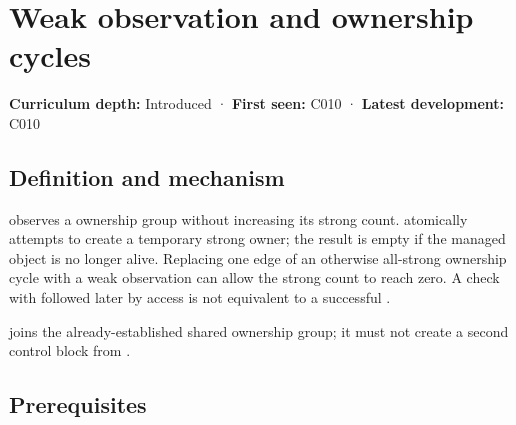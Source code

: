 \hypertarget{appendix-b9548675eb2b}{}\label{referencestart:appendix-b9548675eb2b}
\section{Weak observation and ownership cycles}\label{appendix-b9548675eb2b-weak-observation-and-ownership-cycles}

\hypertarget{appendix-b9548675eb2b-weak-observation-and-ownership-cycles}{}

\textbf{Curriculum depth:} Introduced · \textbf{First seen:} C010 · \textbf{Latest development:} C010

\begin{allmightroledefinition}

\subsection{Definition and mechanism}\label{appendix-b9548675eb2b-definition-and-mechanism}

\hypertarget{appendix-b9548675eb2b-definition-and-mechanism}{}

 observes a  ownership group without increasing its strong count.  atomically attempts to create a temporary strong owner; the result is empty if the managed object is no longer alive. Replacing one edge of an otherwise all-strong ownership cycle with a weak observation can allow the strong count to reach zero. A check with  followed later by access is not equivalent to a successful .

\end{allmightroledefinition}

 joins the already-established shared ownership group; it must not create a second  control block from .

\subsection{Prerequisites}\label{appendix-b9548675eb2b-prerequisites}

